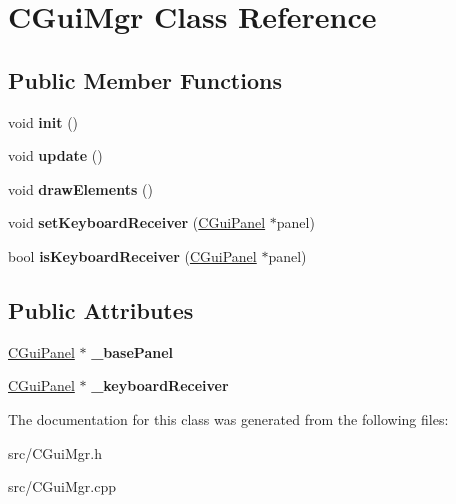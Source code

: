 \hypertarget{class_c_gui_mgr}{
\section{CGuiMgr Class Reference}
\label{class_c_gui_mgr}
}
\subsection*{Public Member Functions}
\begin{DoxyCompactItemize}
\item 
\hypertarget{class_c_gui_mgr_a67a77bf82141c990553ca4ea27144800}{
void {\bfseries init} ()}
\label{class_c_gui_mgr_a67a77bf82141c990553ca4ea27144800}

\item 
\hypertarget{class_c_gui_mgr_ab8f078d06299736a552fa25ea52aba6d}{
void {\bfseries update} ()}
\label{class_c_gui_mgr_ab8f078d06299736a552fa25ea52aba6d}

\item 
\hypertarget{class_c_gui_mgr_a745c61a4ed47b24ec10d404e6603ca7f}{
void {\bfseries drawElements} ()}
\label{class_c_gui_mgr_a745c61a4ed47b24ec10d404e6603ca7f}

\item 
\hypertarget{class_c_gui_mgr_a0b791d7ac971fded45ac14cbffa24840}{
void {\bfseries setKeyboardReceiver} (\hyperlink{class_c_gui_panel}{CGuiPanel} $\ast$panel)}
\label{class_c_gui_mgr_a0b791d7ac971fded45ac14cbffa24840}

\item 
\hypertarget{class_c_gui_mgr_a38ba0aa9d04c8b95cca1145a52a1bd2c}{
bool {\bfseries isKeyboardReceiver} (\hyperlink{class_c_gui_panel}{CGuiPanel} $\ast$panel)}
\label{class_c_gui_mgr_a38ba0aa9d04c8b95cca1145a52a1bd2c}

\end{DoxyCompactItemize}
\subsection*{Public Attributes}
\begin{DoxyCompactItemize}
\item 
\hypertarget{class_c_gui_mgr_aa72d741566ce86412f2ce12081632fe5}{
\hyperlink{class_c_gui_panel}{CGuiPanel} $\ast$ {\bfseries \_\-basePanel}}
\label{class_c_gui_mgr_aa72d741566ce86412f2ce12081632fe5}

\item 
\hypertarget{class_c_gui_mgr_a39faeaa6758cb02d69df4d2308652389}{
\hyperlink{class_c_gui_panel}{CGuiPanel} $\ast$ {\bfseries \_\-keyboardReceiver}}
\label{class_c_gui_mgr_a39faeaa6758cb02d69df4d2308652389}

\end{DoxyCompactItemize}


The documentation for this class was generated from the following files:\begin{DoxyCompactItemize}
\item 
src/CGuiMgr.h\item 
src/CGuiMgr.cpp\end{DoxyCompactItemize}
